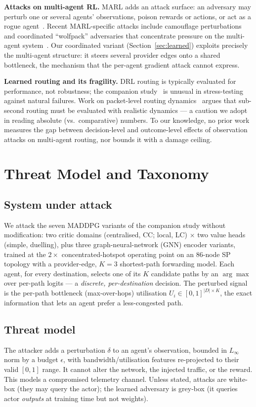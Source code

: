 \documentclass[10pt,journal,comsoc]{IEEEtran}
\begin{document}
\textbf{Attacks on multi-agent RL.} MARL adds an attack surface: an adversary may
perturb one or several agents' observations, poison rewards or actions, or act as a
rogue agent~\cite{survey2025}. Recent MARL-specific attacks include camouflage
perturbations~\cite{camouflage2024} and coordinated ``wolfpack'' adversaries that
concentrate pressure on the multi-agent system~\cite{wolfpack2025}. Our coordinated
variant (Section~\ref{sec:learned}) exploits precisely the multi-agent structure: it
steers several provider edges onto a shared bottleneck, the mechanism that the
per-agent gradient attack cannot express.

\textbf{Learned routing and its fragility.} DRL routing is typically evaluated for
performance, not robustness; the companion study~\cite{companion} is unusual in
stress-testing against natural failures. Work on packet-level routing
dynamics~\cite{packetlevel2024} argues that sub-second routing must be evaluated with
realistic dynamics --- a caution we adopt in reading absolute (vs.\ comparative)
numbers. To our knowledge, no prior work measures the gap between decision-level and
outcome-level effects of observation attacks on multi-agent routing, nor bounds it
with a damage ceiling.

\section{Threat Model and Taxonomy}
\label{sec:threat}
\subsection{System under attack}
We attack the seven MADDPG variants of the companion study without modification: two
critic domains (centralised, CC; local, LC) $\times$ two value heads (simple,
duelling), plus three graph-neural-network (GNN) encoder variants, trained at the
$2\times$ concentrated-hotspot operating point on an 86-node SP topology with a
provider-edge, $K{=}3$ shortest-path forwarding model. Each agent, for every
destination, selects one of its $K$ candidate paths by an $\arg\max$ over per-path
logits --- a \emph{discrete, per-destination} decision. The perturbed signal is the
per-path bottleneck (max-over-hops) utilisation $U_i\in[0,1]^{|D|\times K}$, the exact
information that lets an agent prefer a less-congested path.

\subsection{Threat model}
The attacker adds a perturbation $\delta$ to an agent's observation, bounded in
$L_\infty$ norm by a budget $\epsilon$, with bandwidth/utilisation features
re-projected to their valid $[0,1]$ range. It cannot alter the network, the injected
traffic, or the reward. This models a compromised telemetry channel. Unless stated,
attacks are white-box (they may query the actor); the learned adversary is grey-box
(it queries actor \emph{outputs} at training time but not weights).
\end{document}
